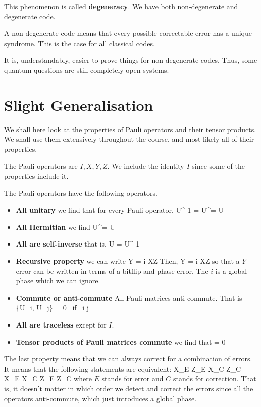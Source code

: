 This phenomenon is called \textbf{degeneracy}. We have both non-degenerate and degenerate code. 

A non-degenerate code means that every possible correctable error has a unique syndrome. This is the case for all classical codes. 

It is, understandably, easier to prove things for non-degenerate codes. Thus, some quantum questions are still completely open systems. 

\section{Slight Generalisation}
We shall here look at the properties of Pauli operators and their tensor products. We shall use them extensively throughout the course, 
and most likely all of their properties. 

The Pauli operators are $I, X, Y, Z$. We include the identity $I$ since some of the properties include it. 

The Pauli operators have the following operators. 
\begin{itemize}
\item \textbf{All unitary} we find that for every Pauli operator, 
\beq
U^{-1} = U^\dagger = U
\eeq
\item \textbf{All Hermitian} we find
\beq
U^\dagger = U
\eeq
\item  \textbf{All are self-inverse} that is, 
\beq
U = U^{-1}
\eeq
\item \textbf{Recursive property} we can write
\beq
Y = i XZ
\eeq
Then, 
\beq
Y \ket{\psi} = i XZ \ket{\psi}
\eeq
so that a $Y$-error can be written in terms of a bitflip and phase error. The $i$ is a global phase which we can ignore. 
\item \textbf{Commute or anti-commute} All Pauli matrices anti commute. That is
\beq
\{U_i, U_j\} = 0 \mbox{ if } i \neq j
\eeq
\item \textbf{All are traceless} except for $I$. 
\item \textbf{Tensor products of Pauli matrices commute} we find that 
 = 0
\eeq

\end{itemize}
The last property means that we can always correct for a combination of errors. It means that the following statements are equivalent:
\beq 
X_E Z_E X_C Z_C
\eeq
\beq
X_E X_C Z_E Z_C
\eeq
where $E$ stands for error and $C$ stands for correction. That is, it doesn't matter in which order we detect and correct the errors since all the operators anti-commute, which just introduces a global phase. 

